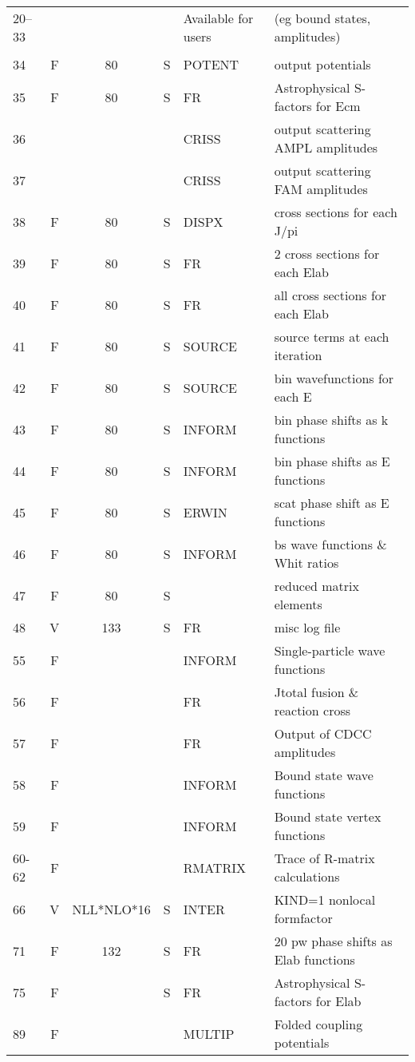 \documentclass[11pt]{article}
\begin{document}
\begin{tabular}{|l | c c c | l | l|}
20--33&    &            &    &     Available for users & (eg bound states, amplitudes)\\
     &  & & & &\\
34    &  F &    80      & S  &     POTENT &   output potentials\\
35    &  F &    80      & S  &     FR & Astrophysical S-factors for Ecm\\
36    &    &            &    &     CRISS & output scattering AMPL amplitudes\\
37    &    &            &    &     CRISS & output scattering FAM amplitudes\\
38    &  F &    80      & S  &     DISPX &    cross sections for each J/pi\\
39    &  F &    80      & S  &      FR   &    2 cross sections for each Elab\\
40    &  F &    80      & S  &      FR   &    all cross sections for each Elab\\
41    &  F &    80      & S  &     SOURCE &   source terms at each iteration\\
42    &  F &    80      & S  &     SOURCE &   bin wavefunctions for each E\\
43    &  F &    80      & S  &     INFORM &   bin phase shifts as k functions\\
44    &  F &    80      & S  &     INFORM &   bin phase shifts as E functions\\
45    &  F &    80      & S  &     ERWIN   &  scat phase shift as E functions\\
46    &  F &    80      & S  &     INFORM &   bs wave functions \& Whit ratios\\
47    &  F &    80      & S  &            &   reduced matrix elements \\
48    & V &   133      & S  &       FR  & misc log file\\
55    &   F &            &    &     INFORM & Single-particle wave functions\\
56    &   F &            &    &     FR & Jtotal fusion \& reaction cross\\
57    &   F &            &    &     FR & Output of CDCC amplitudes\\
58    &   F &            &    &     INFORM & Bound state wave functions \\
59    &   F &            &    &     INFORM & Bound state vertex functions \\
60-62 &   F &            &    &     RMATRIX & Trace of R-matrix calculations\\
66    &  V  &NLL*NLO*16  & S  &     INTER & KIND=1 nonlocal formfactor\\
71    &   F &    132     & S  &     FR   &  20 pw phase shifts as Elab functions\\
75    &  F &            & S  &     FR & Astrophysical S-factors for Elab\\
89    &   F &            &    &     MULTIP& Folded coupling potentials\\
\hline
\end{tabular}
\end{document}
